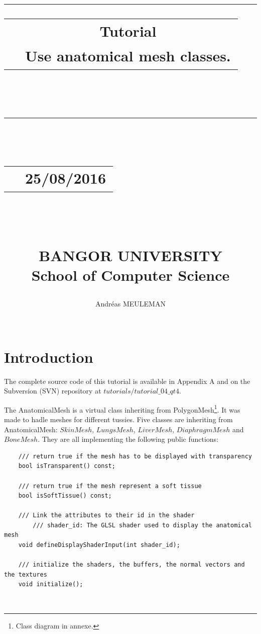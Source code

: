 \documentclass[12pt]{report}
\begin{document}
\newlength{\larg}
\setlength{\larg}{14.5cm}
\lstset{inputencoding=utf8/latin1}
\title{
{\rule{\larg}{1mm}}\vspace{7mm}
\begin{tabular}{p{0cm} c}
   & { {\textbf{Tutorial}}} \\
   & {\huge Use anatomical mesh classes.} \\
\end{tabular}\\
\vspace{2mm}
{\rule{\larg}{1mm}}
\vspace{2mm} \\
\begin{tabular}{p{11cm} r}
   & {\large  25/08/2016}
\end{tabular}\\
\vspace{2cm}
\large{\textit{} \\
BANGOR UNIVERSITY\\
School of Computer Science}
\vspace{5cm}
}
\author{\begin{tabular}{p{13.7cm} r}
Andréas MEULEMAN
\end{tabular}\\
\hline }
\date{}
\maketitle

\chapter{Introduction}

	The complete source code of this tutorial is available in Appendix A and on the Subversion (SVN) repository at $tutorials/tutorial\_04\_qt4$. 
	
	The AnatomicalMesh is a virtual class inheriting from PolygonMesh\footnote{Class diagram in annexe.}. It was made to hadle meshes for different tussies. Five classes are inheriting from AnatomicalMesh: $SkinMesh$, $LungsMesh$, $LiverMesh$, $DiaphragmMesh$ and $BoneMesh$. They are all implementing the following public functions: \\ 

\begin{lstlisting}
	/// return true if the mesh has to be displayed with transparency
	bool isTransparent() const;

	/// return true if the mesh represent a soft tissue
	bool isSoftTissue() const;

	/// Link the attributes to their id in the shader
    	/// shader_id: The GLSL shader used to display the anatomical mesh
	void defineDisplayShaderInput(int shader_id);

	/// initialize the shaders, the buffers, the normal vectors and the textures
	void initialize();
\end{lstlisting}
~\\
\end{document}
